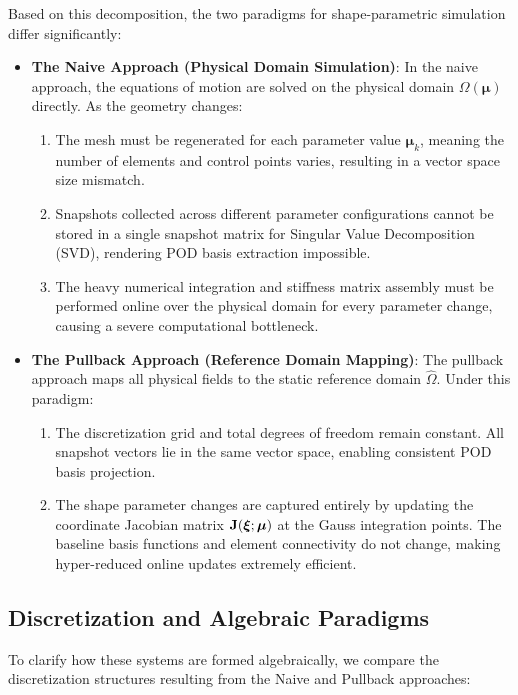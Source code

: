 Based on this decomposition, the two paradigms for shape-parametric simulation differ significantly:
\begin{itemize}
    \item \textbf{The Naive Approach (Physical Domain Simulation)}: In the naive approach, the equations of motion are solved on the physical domain $\Omega(\boldsymbol{\mu})$ directly. As the geometry changes:
          \begin{enumerate}
              \item The mesh must be regenerated for each parameter value $\boldsymbol{\mu}_k$, meaning the number of elements and control points varies, resulting in a vector space size mismatch.
              \item Snapshots collected across different parameter configurations cannot be stored in a single snapshot matrix for Singular Value Decomposition (SVD), rendering POD basis extraction impossible.
              \item The heavy numerical integration and stiffness matrix assembly must be performed online over the physical domain for every parameter change, causing a severe computational bottleneck.
          \end{enumerate}
    \item \textbf{The Pullback Approach (Reference Domain Mapping)}: The pullback approach maps all physical fields to the static reference domain $\hat{\Omega}$. Under this paradigm:
          \begin{enumerate}
              \item The discretization grid and total degrees of freedom remain constant. All snapshot vectors lie in the same vector space, enabling consistent POD basis projection.
              \item The shape parameter changes are captured entirely by updating the coordinate Jacobian matrix $\mathbf{J}(\boldsymbol{\xi}; \boldsymbol{\mu})$ at the Gauss integration points. The baseline basis functions and element connectivity do not change, making hyper-reduced online updates extremely efficient.
          \end{enumerate}
\end{itemize}

\subsection{Discretization and Algebraic Paradigms}
To clarify how these systems are formed algebraically, we compare the discretization structures resulting from the Naive and Pullback approaches:


